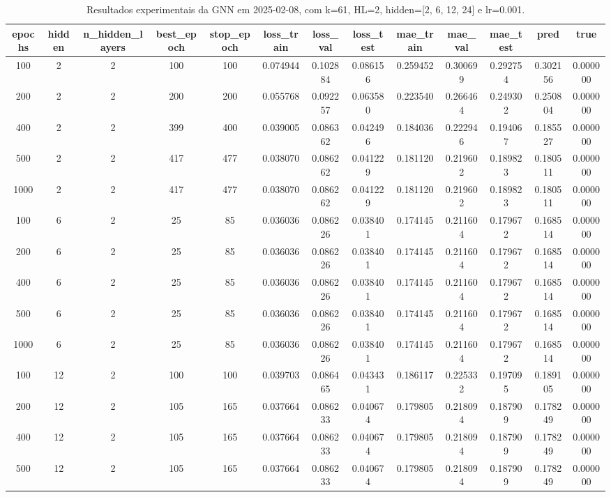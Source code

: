 \begin{table}[h]
\centering
\caption{Resultados experimentais da GNN em 2025-02-08, com k=61, HL=2, hidden=[2, 6, 12, 24] e lr=0.001.}
\label{tab:gnn_results_k61_hl2_d20250208}
\begin{tabular}{ccccccccccccc}
\toprule
epochs & hidden & n\_hidden\_layers & best\_epoch & stop\_epoch & loss\_train & loss\_val & loss\_test & mae\_train & mae\_val & mae\_test & pred & true \\
\midrule
100 & 2 & 2 & 100 & 100 & 0.074944 & 0.102884 & 0.086156 & 0.259452 & 0.300699 & 0.292754 & 0.302156 & 0.000000 \\
200 & 2 & 2 & 200 & 200 & 0.055768 & 0.092257 & 0.063580 & 0.223540 & 0.266464 & 0.249302 & 0.250804 & 0.000000 \\
400 & 2 & 2 & 399 & 400 & 0.039005 & 0.086362 & 0.042496 & 0.184036 & 0.222946 & 0.194067 & 0.185527 & 0.000000 \\
500 & 2 & 2 & 417 & 477 & 0.038070 & 0.086262 & 0.041229 & 0.181120 & 0.219602 & 0.189823 & 0.180511 & 0.000000 \\
1000 & 2 & 2 & 417 & 477 & 0.038070 & 0.086262 & 0.041229 & 0.181120 & 0.219602 & 0.189823 & 0.180511 & 0.000000 \\
100 & 6 & 2 & 25 & 85 & 0.036036 & 0.086226 & 0.038401 & 0.174145 & 0.211604 & 0.179672 & 0.168514 & 0.000000 \\
200 & 6 & 2 & 25 & 85 & 0.036036 & 0.086226 & 0.038401 & 0.174145 & 0.211604 & 0.179672 & 0.168514 & 0.000000 \\
400 & 6 & 2 & 25 & 85 & 0.036036 & 0.086226 & 0.038401 & 0.174145 & 0.211604 & 0.179672 & 0.168514 & 0.000000 \\
500 & 6 & 2 & 25 & 85 & 0.036036 & 0.086226 & 0.038401 & 0.174145 & 0.211604 & 0.179672 & 0.168514 & 0.000000 \\
1000 & 6 & 2 & 25 & 85 & 0.036036 & 0.086226 & 0.038401 & 0.174145 & 0.211604 & 0.179672 & 0.168514 & 0.000000 \\
100 & 12 & 2 & 100 & 100 & 0.039703 & 0.086465 & 0.043431 & 0.186117 & 0.225332 & 0.197095 & 0.189105 & 0.000000 \\
200 & 12 & 2 & 105 & 165 & 0.037664 & 0.086233 & 0.040674 & 0.179805 & 0.218094 & 0.187909 & 0.178249 & 0.000000 \\
400 & 12 & 2 & 105 & 165 & 0.037664 & 0.086233 & 0.040674 & 0.179805 & 0.218094 & 0.187909 & 0.178249 & 0.000000 \\
500 & 12 & 2 & 105 & 165 & 0.037664 & 0.086233 & 0.040674 & 0.179805 & 0.218094 & 0.187909 & 0.178249 & 0.000000 \\

\end{tabular}
\end{table}
